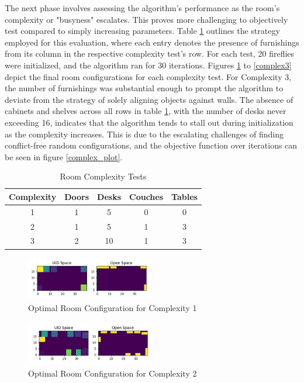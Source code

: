 \documentclass[sigconf,authordraft]{acmart}
\begin{document}
The next phase involves assessing the algorithm's performance as the room's complexity or "busyness" escalates. This proves more challenging to objectively test compared to simply increasing parameters. Table \ref{room_complexity_table} outlines the strategy employed for this evaluation, where each entry denotes the presence of furnishings from its column in the respective complexity test's row. For each test, 20 fireflies were initialized, and the algorithm ran for 30 iterations. Figures \ref{complex1} to \ref{complex3} depict the final room configurations for each complexity test. For Complexity 3, the number of furnishings was substantial enough to prompt the algorithm to deviate from the strategy of solely aligning objects against walls. The absence of cabinets and shelves across all rows in table \ref{room_complexity_table}, with the number of desks never exceeding 16, indicates that the algorithm tends to stall out during initialization as the complexity increases. This is due to the escalating challenges of finding conflict-free random configurations, and the objective function over iterations can be seen in figure \ref{complex_plot}.

\begin{table}
    \centering
    \caption{Room Complexity Tests}
    \label{room_complexity_table}
    \begin{tabular}{|c|c|c|c|c|}
        \hline
        \textbf{Complexity} & \textbf{Doors} & \textbf{Desks} & \textbf{Couches} & \textbf{Tables} \\
        \hline
        1 & 1 & 5 & 0 & 0 \\
        2 & 1 & 5 & 1 & 3 \\
        3 & 2 & 10 & 1 & 3 \\
        \hline
    \end{tabular}
\end{table}

\begin{figure}
    \centering
    \includegraphics[width=0.5\textwidth]{conor1.png}
    \caption{Optimal Room Configuration for Complexity 1}
    \label{complex1}
\end{figure}

\begin{figure}
    \centering
    \includegraphics[width=0.5\textwidth]{conor2.png}
    \caption{Optimal Room Configuration for Complexity 2}
    \label{complex2}
\end{figure}
\end{document}
